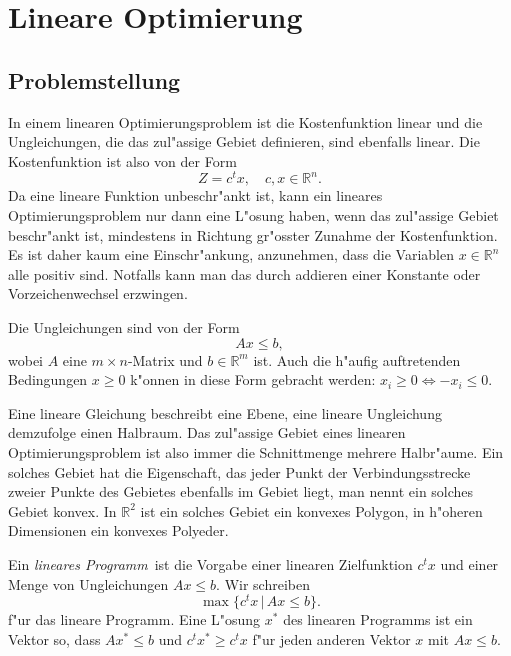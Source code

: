 \chapter{Lineare Optimierung\label{chapter-lineare-optimierung}}

\section{Problemstellung\label{lp:section:problem}}
In einem linearen Optimierungsproblem ist die Kostenfunktion linear
und die Ungleichungen, die das zul"assige Gebiet definieren, sind
ebenfalls linear. 
Die Kostenfunktion ist also von der Form
\[
Z=c^tx,\quad c,x\in\mathbb R^n.
\]
Da eine lineare Funktion unbeschr"ankt ist, kann ein lineares
Optimierungsproblem nur dann eine L"osung haben, wenn das zul"assige
Gebiet beschr"ankt ist, mindestens in Richtung gr"osster Zunahme der
Kostenfunktion. Es ist daher kaum eine Einschr"ankung, anzunehmen, dass 
die Variablen $x\in\mathbb R^n$ alle positiv sind. Notfalls kann man 
das durch addieren einer Konstante oder Vorzeichenwechsel erzwingen.

Die Ungleichungen sind von der Form
\[
Ax\le b,
\]
wobei $A$ eine $m\times n$-Matrix und $b\in\mathbb R^m$ ist.
Auch die h"aufig auftretenden Bedingungen $x\ge 0$ k"onnen in
diese Form gebracht werden: $x_i\ge 0\Leftrightarrow -x_i \le 0$.

Eine lineare Gleichung beschreibt eine Ebene, eine
lineare Ungleichung demzufolge einen Halbraum. Das zul"assige Gebiet
eines linearen Optimierungsproblem ist also immer die Schnittmenge
mehrere Halbr"aume.
Ein solches Gebiet hat die Eigenschaft, das jeder Punkt der
Verbindungsstrecke zweier Punkte des Gebietes ebenfalls im Gebiet liegt,
man nennt ein solches Gebiet konvex.
In $\mathbb R^2$  ist ein solches Gebiet ein konvexes Polygon,
in h"oheren Dimensionen ein konvexes Polyeder.

\begin{definition}
Ein {\em lineares Programm}\,
ist die Vorgabe einer linearen Zielfunktion
$c^tx$ und einer Menge von Ungleichungen $Ax\le b$.
Wir schreiben
\[
\max\{c^tx\,|\,Ax\le b\}.
\]
f"ur das lineare Programm. Eine L"osung $x^*$ des linearen Programms
ist ein Vektor so, dass $Ax^*\le b$ und $c^tx^*\ge c^tx$ f"ur jeden
anderen Vektor $x$ mit $Ax\le b$.
\end{definition}

